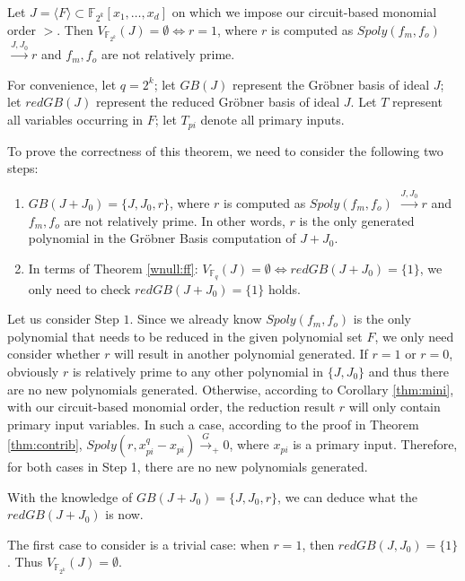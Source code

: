 \begin{Theorem}\label{thm:miter}
Let $J=\langle F \rangle \subset \mathbb{F}_{2^k}[x_{1},\dots,x_{d}]$ 
on which we impose our circuit-based monomial order $>$.
Then $V_{\mathbb{F}_{2^k}}(J)=\emptyset \iff r=1$, where $r$ is computed as 
$Spoly(f_m,f_o)$ $\stackrel{J,J_0}{\longrightarrow} r$ and $f_m, f_o$ are not relatively prime. 
\end{Theorem}

\begin{Proof}
For convenience, let $q=2^k$; let $GB(J)$ represent the Gr\"obner basis of ideal $J$; let $redGB(J)$ represent the reduced Gr\"obner basis of ideal $J$.
Let $T$ represent all variables occurring in $F$; let $T_{pi}$ denote all primary inputs.

To prove the correctness of this theorem, we need to consider the following two steps:
\begin{enumerate}
\item $GB(J+J_{0})=\{J,J_{0},r\}$, where $r$ is computed as $Spoly(f_m,f_o)$ $\stackrel{J,J_0}{\longrightarrow} r$ and $f_m, f_o$ are not relatively prime. 
		In other words, $r$ is the only generated polynomial in the Gr\"obner Basis computation of $J+J_{0}$.
\item In terms of Theorem \ref{wnull:ff}: $V_{\mathbb{F}_{q}}(J)=\emptyset \iff redGB(J+J_{0})=\{1\}$, we only need to check 
		$redGB(J+J_{0})=\{1\}$ holds.
\end{enumerate}

Let us consider Step $1$.
Since we already know $Spoly(f_m,f_o)$ is the only polynomial that needs to be reduced in the given polynomial set $F$, 
we only need consider whether $r$ will result in another polynomial generated. If $r=1$ or $r=0$, obviously $r$ is relatively prime 
to any other polynomial in $\{J,J_{0}\}$ and thus there are no new polynomials generated. 
Otherwise, according to Corollary \ref{thm:mini}, with our circuit-based monomial order, the reduction result $r$ 
will only contain primary input variables. In such a case, according to the proof in Theorem \ref{thm:contrib},
$Spoly(r,x_{pi}^{q}-x_{pi}) \stackrel{G}\rightarrow _+0$, where $x_{pi}$ is a primary input. Therefore, for both cases in Step 1,
there are no new polynomials generated.

With the knowledge of $GB(J+J_{0})=\{J,J_{0},r\}$, we can deduce what the $redGB(J+J_{0})$ is now.

The first case to consider is a trivial case: when $r=1$, then $redGB(J,J_0)=\{1\}$. Thus $V_{\mathbb{F}_{2^k}}(J) = \emptyset$. 


\end{Proof}
